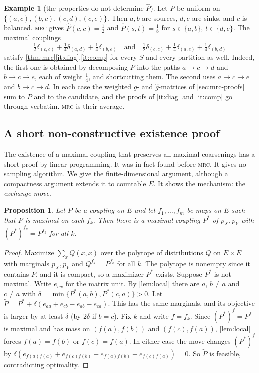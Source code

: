 \documentclass[11pt]{article}
\newtheorem{proposition}[theorem]{Proposition}
\theoremstyle{definition}
\newtheorem{example}[theorem]{Example}
\newcommand{\pX}{p_X}
\newcommand{\pY}{p_Y}
\newcommand{\hP}{\hat P}
\newcommand{\MRC}{\textnormal{\textsc{mrc}}}
\begin{document}
\begin{example}[the properties do not determine $\hP$]\label{ex:nonunique}
Let $P$ be uniform on $\{(a,c),(b,c),(c,d),(c,e)\}$. Then $a,b$ are sources, $d,e$
are sinks, and $c$ is balanced. \MRC{} gives
$\hP(c,c)=\tfrac12$ and $\hP(s,t)=\tfrac18$ for $s\in\{a,b\}$, $t\in\{d,e\}$.
The maximal couplings
\[
\tfrac12\delta_{(c,c)}+\tfrac14\delta_{(a,d)}+\tfrac14\delta_{(b,e)}\quad\text{and}\quad
\tfrac12\delta_{(c,c)}+\tfrac14\delta_{(a,e)}+\tfrac14\delta_{(b,d)}
\]
satisfy
\cref{thm:mrc}\ref{it:diag},\ref{it:comp} for every $S$ and every partition as
well. Indeed, the first one is obtained by decomposing $P$ into the paths
$a\to c\to d$ and $b\to c\to e$, each of weight $\tfrac14$, and shortcutting them.
The second uses $a\to c\to e$ and $b\to c\to d$. In each case the weighted $g$-
and $\hat g$-matrices of \cref{sec:mrc-proofs} sum to $P$ and to the candidate,
and the proofs of \ref{it:diag} and \ref{it:comp} go through verbatim. \MRC{} is
their average.
\end{example}

\subsection{A short non-constructive existence proof}

The existence of a maximal coupling that preserves all maximal coarsenings has a
short proof by linear programming. It was in fact found before \MRC{}. It gives
no sampling algorithm. We give the finite-dimensional argument, although a
compactness argument extends it to countable $E$. It shows the mechanism: the
\emph{exchange move}.

\begin{proposition}\label{prop:lp}
Let $P$ be a coupling on $E$ and let $f_1,\dots,f_m$ be maps on $E$ such that $P$
is maximal on each $f_k$. Then there is a maximal coupling $P^*$ of $\pX,\pY$
with $(P^*)^{f_k}=P^{f_k}$ for all $k$.
\end{proposition}
\begin{proof}
Maximize $\sum_x Q(x,x)$ over the polytope of distributions $Q$ on $E\times E$
with marginals $\pX,\pY$ and $Q^{f_k}=P^{f_k}$ for all $k$. The polytope is
nonempty since it contains $P$, and it is compact, so a maximizer $P^*$ exists.
Suppose $P^*$ is not maximal. Write $e_{vw}$ for the matrix unit. By \cref{lem:local} there are $a$, $b\neq a$ and
$c\neq a$ with $\delta=\min\{P^*(a,b),P^*(c,a)\}>0$. Let
$\tilde P=P^*+\delta(e_{aa}+e_{cb}-e_{ab}-e_{ca})$. This has the same marginals,
and its objective is larger by at least $\delta$ (by $2\delta$ if $b=c$). Fix $k$ and write $f=f_k$. Since
$(P^*)^f=P^f$ is maximal and has mass on $(f(a),f(b))$ and $(f(c),f(a))$,
\cref{lem:local} forces $f(a)=f(b)$ or $f(c)=f(a)$. In either case the move
changes $(P^*)^f$ by
$\delta(e_{f(a)f(a)}+e_{f(c)f(b)}-e_{f(a)f(b)}-e_{f(c)f(a)})=0$. So $\tilde P$ is
feasible, contradicting optimality.
\end{proof}
\end{document}
